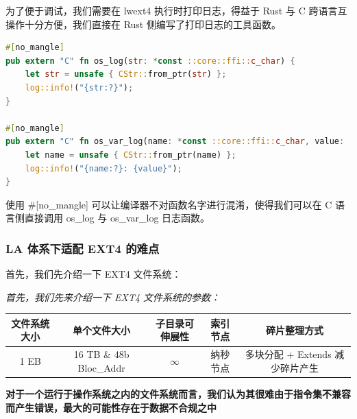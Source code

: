 为了便于调试，我们需要在 lwext4 执行时打印日志，得益于 Rust 与 C 跨语言互操作十分方便，我们直接在 Rust 侧编写了打印日志的工具函数。

\begin{lstlisting}[language={Rust}, caption={在 lwext4 的 C 语言代码中打印日志}]
#[no_mangle]
pub extern "C" fn os_log(str: *const ::core::ffi::c_char) {
    let str = unsafe { CStr::from_ptr(str) };
    log::info!("{str:?}");
}

#[no_mangle]
pub extern "C" fn os_var_log(name: *const ::core::ffi::c_char, value: ::core::ffi::c_int) {
    let name = unsafe { CStr::from_ptr(name) };
    log::info!("{name:?}: {value}");
}
\end{lstlisting}

使用 \#[no_mangle] 可以让编译器不对函数名字进行混淆，使得我们可以在 C 语言侧直接调用 os_log 与 os_var_log 日志函数。


\subsubsection{LA 体系下适配 EXT4 的难点}

首先，我们先介绍一下 EXT4 文件系统：

\begin{center}
    \textit{首先，我们先来介绍一下 EXT4 文件系统的参数：}
    \begin{table}[htbp]
        \begin{tabular}{|c|c|c|c|c|}
            \hline
            文件系统大小 & 单个文件大小 & 子目录可伸展性 & 索引节点 & 碎片整理方式 \\
            \hline
            1 EB & 16 TB \& 48b Bloc_Addr & $\infty$ & 纳秒节点 & 多块分配 + Extends 减少碎片产生 \\
            \hline
        \end{tabular}
    \end{table}
    \textbf{对于一个运行于操作系统之内的文件系统而言，我们认为其很难由于指令集不兼容而产生错误，最大的可能性存在于数据不合规之中}
\end{center}

